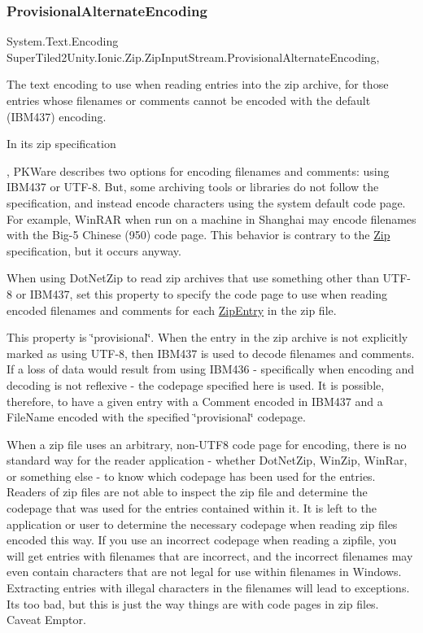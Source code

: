 \subsubsection{\texorpdfstring{Provisional\+Alternate\+Encoding}{ProvisionalAlternateEncoding}}
{\footnotesize\ttfamily System.\+Text.\+Encoding Super\+Tiled2\+Unity.\+Ionic.\+Zip.\+Zip\+Input\+Stream.\+Provisional\+Alternate\+Encoding\hspace{0.3cm}{\ttfamily [get]}, {\ttfamily [set]}}



The text encoding to use when reading entries into the zip archive, for those entries whose filenames or comments cannot be encoded with the default (I\+B\+M437) encoding. 

In its zip specification

, P\+K\+Ware describes two options for encoding filenames and comments\+: using I\+B\+M437 or U\+T\+F-\/8. But, some archiving tools or libraries do not follow the specification, and instead encode characters using the system default code page. For example, Win\+R\+AR when run on a machine in Shanghai may encode filenames with the Big-\/5 Chinese (950) code page. This behavior is contrary to the \mbox{\hyperlink{namespace_super_tiled2_unity_1_1_ionic_1_1_zip}{Zip}} specification, but it occurs anyway. 

When using Dot\+Net\+Zip to read zip archives that use something other than U\+T\+F-\/8 or I\+B\+M437, set this property to specify the code page to use when reading encoded filenames and comments for each {\ttfamily \mbox{\hyperlink{class_super_tiled2_unity_1_1_ionic_1_1_zip_1_1_zip_entry}{Zip\+Entry}}} in the zip file. 

This property is \char`\"{}provisional\char`\"{}. When the entry in the zip archive is not explicitly marked as using U\+T\+F-\/8, then I\+B\+M437 is used to decode filenames and comments. If a loss of data would result from using I\+B\+M436 -\/ specifically when encoding and decoding is not reflexive -\/ the codepage specified here is used. It is possible, therefore, to have a given entry with a {\ttfamily Comment} encoded in I\+B\+M437 and a {\ttfamily File\+Name} encoded with the specified \char`\"{}provisional\char`\"{} codepage. 

When a zip file uses an arbitrary, non-\/\+U\+T\+F8 code page for encoding, there is no standard way for the reader application -\/ whether Dot\+Net\+Zip, Win\+Zip, Win\+Rar, or something else -\/ to know which codepage has been used for the entries. Readers of zip files are not able to inspect the zip file and determine the codepage that was used for the entries contained within it. It is left to the application or user to determine the necessary codepage when reading zip files encoded this way. If you use an incorrect codepage when reading a zipfile, you will get entries with filenames that are incorrect, and the incorrect filenames may even contain characters that are not legal for use within filenames in Windows. Extracting entries with illegal characters in the filenames will lead to exceptions. It\textquotesingle{}s too bad, but this is just the way things are with code pages in zip files. Caveat Emptor. 

